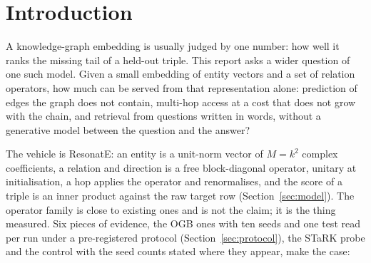 \documentclass[11pt,a4paper]{article}
\begin{document}
\begin{abstract}
among published rows on Hit@5, Recall@20 and MRR, second on Hit@1 to
AF-Retriever \citep{boer2026afretriever}, which runs a 120B language
model on every question---and 28.6~/~53.1~/~61.9~/~40.7 on 98 human-written
questions, where the query-time LLM pipelines are far ahead on Hit@1
(58.8) and only Recall@20 is level (the third of four disclosed reads,
chosen by a rule fixed before the fourth). A
RotatE embedding of the same width and near-equal link MRR takes the
identical language projection at 15.8 against 19.7 Hit@1 frozen and 21.2
against 26.9 jointly: equal link prediction does not imply equal
usefulness for language.
\emph{What did not compile.} Two pre-registered attempts to give the
representation an intersection operator failed; real and complex operators tie;
block size is flat; a learned combiner that would top the wikikg2 board
is reported and not filed because it is fit on validation labels.
The observation the evidence supports is that a knowledge representation
can be more than a link-prediction model: the same compact representation
supports prediction, direct access and, through a separately trained
pipeline of pretrained encoders around it, language-conditioned retrieval
without a generative model in the inference path. Code, receipts,
checkpoints and every development test read are released.
\end{abstract}

\section{Introduction}

A knowledge-graph embedding is usually judged by one number: how well it
ranks the missing tail of a held-out triple. This report asks a wider
question of one such model. Given a small embedding of entity vectors and a
set of relation operators, how much can be served from that representation alone:
prediction of edges the graph does not contain, multi-hop access at a
cost that does not grow with the chain, and retrieval from questions
written in words, without a generative model between the question and
the answer?

The vehicle is ResonatE: an entity is a unit-norm vector of $M=k^2$
complex coefficients, a relation and direction is a free block-diagonal
operator, unitary at initialisation, a hop applies the operator and
renormalises, and the score of a triple is an inner product against the
raw target row (Section~\ref{sec:model}). The operator family is close to
existing ones and is not the claim; it is the thing measured. Six pieces
of evidence, the OGB ones with ten seeds and one test read per run under
a pre-registered protocol (Section~\ref{sec:protocol}), the STaRK probe
and the control with the seed counts stated where they appear, make the
case:
\end{document}
